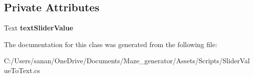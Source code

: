 \subsection*{Private Attributes}
\begin{DoxyCompactItemize}
\item 
\mbox{\label{class_slider_value_to_text_ac584919950ecdf017a340a25d80c561d}} 
Text {\bfseries text\+Slider\+Value}
\end{DoxyCompactItemize}


The documentation for this class was generated from the following file\+:\begin{DoxyCompactItemize}
\item 
C\+:/\+Users/sanan/\+One\+Drive/\+Documents/\+Maze\+\_\+generator/\+Assets/\+Scripts/Slider\+Value\+To\+Text.\+cs\end{DoxyCompactItemize}
